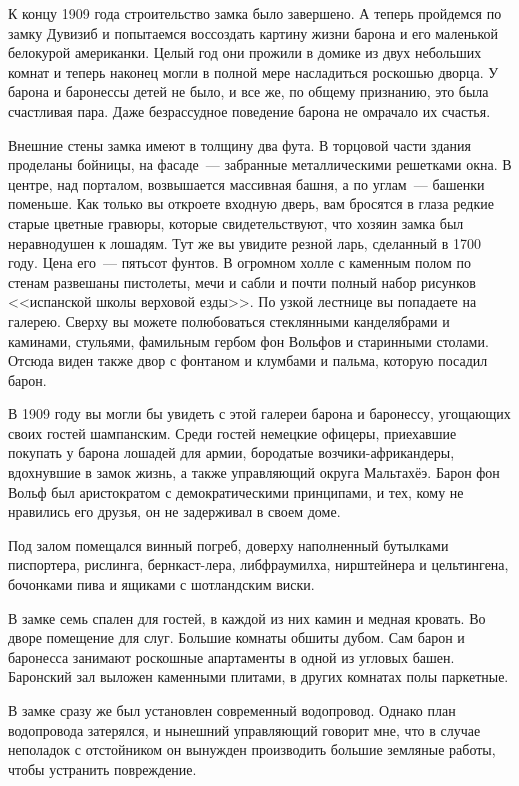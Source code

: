 \documentclass[12pt,a4paper,twoside,openany,svgnames]{memoir}
\begin{document}
К концу 1909 года строительство замка было завершено. А теперь пройдемся по замку Дувизиб и попытаемся воссоздать картину жизни барона и его маленькой белокурой американки. Целый год они прожили в домике из двух небольших комнат и теперь наконец могли в полной мере насладиться роскошью дворца. У барона и баронессы детей не было, и все же, по общему признанию, это была счастливая пара. Даже безрассудное поведение барона не омрачало их счастья.

Внешние стены замка имеют в толщину два фута. В торцовой части здания проделаны бойницы, на фасаде~--- забранные металлическими решетками окна. В центре, над порталом, возвышается массивная башня, а по углам~--- башенки поменьше. Как только вы откроете входную дверь, вам бросятся в глаза редкие старые цветные гравюры, которые свидетельствуют, что хозяин замка был неравнодушен к лошадям. Тут же вы увидите резной ларь, сделанный в 1700 году. Цена его~--- пятьсот фунтов. В огромном холле с каменным полом по стенам развешаны пистолеты, мечи и сабли и почти полный набор рисунков <<испанской школы верховой езды>>. По узкой лестнице вы попадаете на галерею. Сверху вы можете полюбоваться стеклянными канделябрами и каминами, стульями, фамильным гербом фон Вольфов и старинными столами. Отсюда виден также двор с фонтаном и клумбами и пальма, которую посадил барон.

В 1909 году вы могли бы увидеть с этой галереи барона и баронессу, угощающих своих гостей шампанским. Среди гостей немецкие офицеры, приехавшие покупать у барона лошадей для армии, бородатые возчики-африкандеры, вдохнувшие в замок жизнь, а также управляющий округа Мальтахёэ. Барон фон Вольф был аристократом с демократическими принципами, и тех, кому не нравились его друзья, он не задерживал в своем доме.

Под залом помещался винный погреб, доверху наполненный бутылками писпортера, рислинга, бернкаст-лера, либфраумилха, нирштейнера и цельтингена, бочонками пива и ящиками с шотландским виски.

В замке семь спален для гостей, в каждой из них камин и медная кровать. Во дворе помещение для слуг. Большие комнаты обшиты дубом. Сам барон и баронесса занимают роскошные апартаменты в одной из угловых башен. Баронский зал выложен каменными плитами, в других комнатах полы паркетные.

В замке сразу же был установлен современный водопровод. Однако план водопровода затерялся, и нынешний управляющий говорит мне, что в случае неполадок с отстойником он вынужден производить большие земляные работы, чтобы устранить повреждение.
\end{document}

